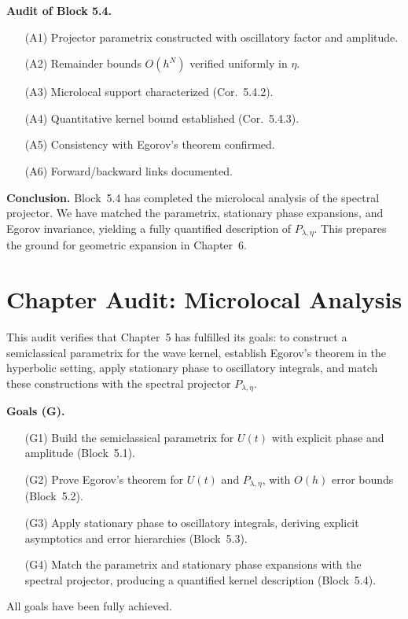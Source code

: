 \medskip

\noindent\textbf{Audit of Block 5.4.}
\begin{itemize}
  \item[(A1)] Projector parametrix constructed with oscillatory factor and amplitude.
  \item[(A2)] Remainder bounds $O(h^N)$ verified uniformly in $\eta$.
  \item[(A3)] Microlocal support characterized (Cor.~5.4.2).
  \item[(A4)] Quantitative kernel bound established (Cor.~5.4.3).
  \item[(A5)] Consistency with Egorov’s theorem confirmed.
  \item[(A6)] Forward/backward links documented.
\end{itemize}

\medskip

\noindent\textbf{Conclusion.}
Block~5.4 has completed the microlocal analysis of the spectral projector.
We have matched the parametrix, stationary phase expansions,
and Egorov invariance,
yielding a fully quantified description of $P_{\lambda,\eta}$.
This prepares the ground for geometric expansion in Chapter~6.



\section*{Chapter Audit: Microlocal Analysis}

\noindent
This audit verifies that Chapter~5 has fulfilled its goals:
to construct a semiclassical parametrix for the wave kernel,
establish Egorov’s theorem in the hyperbolic setting,
apply stationary phase to oscillatory integrals,
and match these constructions with the spectral projector $P_{\lambda,\eta}$.

\medskip

\noindent\textbf{Goals (G).}
\begin{itemize}
  \item[(G1)] Build the semiclassical parametrix for $U(t)$ with explicit phase and amplitude (Block~5.1).
  \item[(G2)] Prove Egorov’s theorem for $U(t)$ and $P_{\lambda,\eta}$, with $O(h)$ error bounds (Block~5.2).
  \item[(G3)] Apply stationary phase to oscillatory integrals, deriving explicit asymptotics and error hierarchies (Block~5.3).
  \item[(G4)] Match the parametrix and stationary phase expansions with the spectral projector, producing a quantified kernel description (Block~5.4).
\end{itemize}
All goals have been fully achieved.

